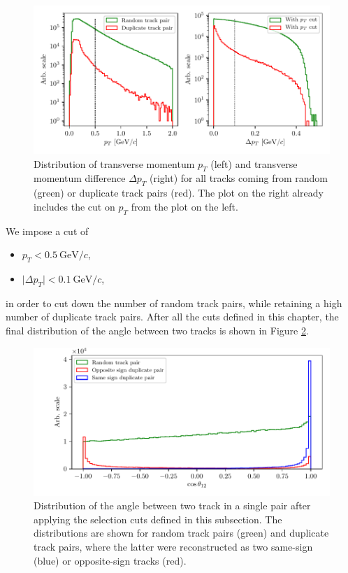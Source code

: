 \documentclass[oneside,a4paper,openany,12pt]{scrbook}
\newcommand {\e}[1]{\mathrm{~#1}}
\begin{document}
\begin{figure}[H]
\centering
\captionsetup{width=0.8\linewidth}
\includegraphics[width=\linewidth]{fig/ROECleanup_dup_pt}
\caption{Distribution of transverse momentum $p_T$ (left) and transverse momentum difference $\Delta p_T$ (right) for all tracks coming from random (green) or duplicate track pairs (red). The plot on the right already includes the cut on $p_T$ from the plot on the left.}
\label{fig:ROE_dupPt}
\end{figure}

We impose a cut of
\begin{itemize}
\item $p_T < 0.5\e{GeV}/c$,
\item $\vert \Delta p_T \vert < 0.1\e{GeV}/c$,
\end{itemize}

in order to cut down the number of random track pairs, while retaining a high number of duplicate track pairs. After all the cuts defined in this chapter, the final distribution of the angle between two tracks is shown in Figure \ref{fig:ROE_dupAngleFinal}.

\begin{figure}[H]
\centering
\captionsetup{width=0.8\linewidth}
\includegraphics[width=\linewidth]{fig/ROECleanup_dup_angle_final}
\caption{Distribution of the angle between two track in a single pair after applying the selection cuts defined in this subsection. The distributions are shown for random track pairs (green) and duplicate track pairs, where the latter were reconstructed as two same-sign (blue) or opposite-sign tracks (red).}
\label{fig:ROE_dupAngleFinal}
\end{figure}
\end{document}
